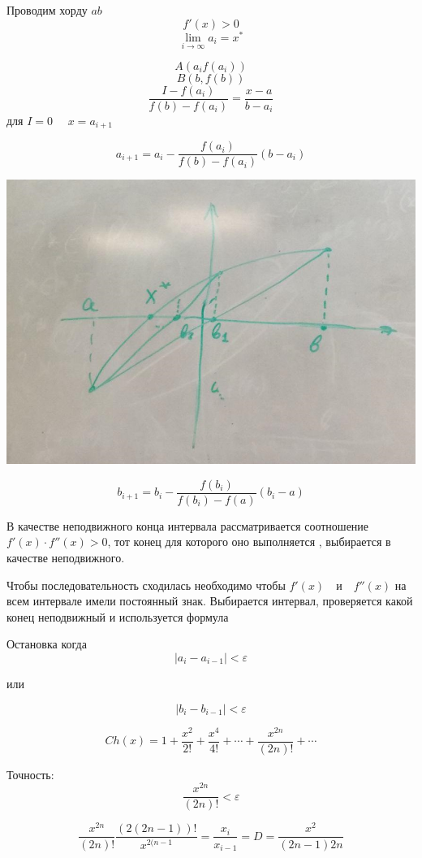 \documentclass[11pt]{article}
\begin{document}
Проводим хорду $ab$
\\
\[f'(x) > 0\]
\[\lim\limits_{i \to \infty}a_i = x^*\]

\[A(a_i f(a_i))\]
\[B (b, f(b))\]
\[\frac{I - f(a_i)}{f(b) - f(a_i)} = \frac{x-a}{b-a_i}\]
для $I = 0 \quad$ $x = a_{i+1}$

\[a_{i+1} = a_i - \frac{f(a_i)}{f(b) - f(a_i)}(b-a_i)\]

\begin{center}
\includegraphics[scale=0.8]{рис4.jpg} 
\end{center}


\[b_{i+1} = b_i - \frac{f(b_i)}{f(b_i) - f(a)}(b_i - a)\]

В качестве неподвижного конца интервала рассматривается соотношение $f'(x) \cdot f''(x) > 0$, тот конец для которого оно выполняется , выбирается в качестве неподвижного.

Чтобы последовательность сходилась необходимо чтобы $f'(x) \quad \text{и} \quad f''(x) $ на всем интервале имели постоянный знак. 
Выбирается интервал, проверяется какой конец неподвижный и используется формула

Остановка когда \[|a_i - a_{i-1}| < \varepsilon\] \begin{center}
или
\end{center}
\[|b_i - b_{i-1}| < \varepsilon\]

\[Ch(x) = 1 + \frac{x^2}{2!} + \frac{x^4}{4!} + \cdots + \frac{x^{2n}}{(2n)!} + \cdots\]

Точность: \[\frac{x^{2n}}{(2n)!} < \varepsilon\]

\[\frac{x^{2n}}{(2n)!} \frac{(2(2n-1))!}{x^{2(n-1}} = \frac{x_i}{x_{i-1}} = D = \frac{x^{2}}{(2n-1)2n}\]
\end{document}
